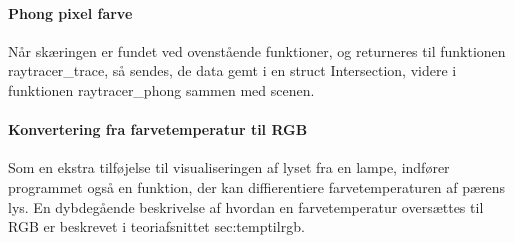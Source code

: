 \paragraph{Phong pixel farve}
Når skæringen er fundet ved ovenstående funktioner, og returneres til funktionen raytracer\_trace, så sendes, de data gemt i en struct Intersection, videre i funktionen raytracer\_phong sammen med scenen.


\paragraph{Konvertering fra farvetemperatur til RGB}
Som en ekstra tilføjelse til visualiseringen af lyset fra en lampe, indfører programmet også en funktion, der kan diffierentiere farvetemperaturen af pærens lys. En dybdegående beskrivelse af hvordan en farvetemperatur oversættes til RGB er beskrevet i teoriafsnittet {sec:temptilrgb}. 












